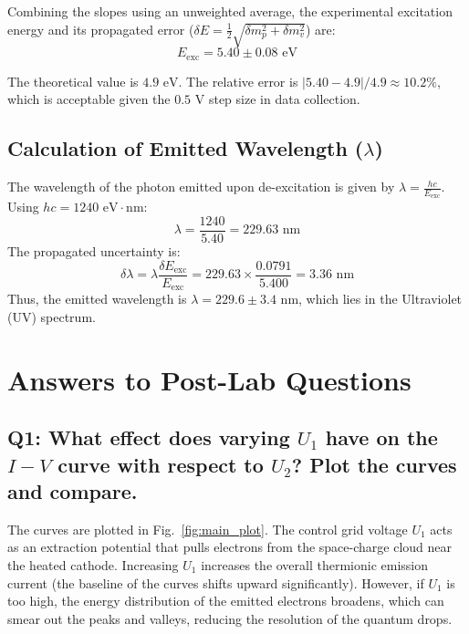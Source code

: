 \documentclass[a4paper,11pt]{article}
\begin{document}
Combining the slopes using an unweighted average, the experimental excitation energy and its propagated error ($\delta E = \frac{1}{2}\sqrt{\delta m_p^2 + \delta m_v^2}$) are:
\begin{equation}
    E_{\text{exc}} = 5.40 \pm 0.08\text{ eV}
\end{equation}

The theoretical value is $4.9\text{ eV}$. The relative error is $|5.40 - 4.9|/4.9 \approx 10.2\%$, which is acceptable given the $0.5\text{ V}$ step size in data collection.

\subsection{Calculation of Emitted Wavelength ($\lambda$)}
The wavelength of the photon emitted upon de-excitation is given by $\lambda = \frac{hc}{E_{\text{exc}}}$. 
Using $hc = 1240\text{ eV}\cdot\text{nm}$:
\begin{equation}
    \lambda = \frac{1240}{5.40} = 229.63\text{ nm}
\end{equation}
The propagated uncertainty is:
\begin{equation}
    \delta \lambda = \lambda \frac{\delta E_{\text{exc}}}{E_{\text{exc}}} = 229.63 \times \frac{0.0791}{5.400} = 3.36\text{ nm}
\end{equation}
Thus, the emitted wavelength is $\lambda = 229.6 \pm 3.4\text{ nm}$, which lies in the Ultraviolet (UV) spectrum.

\section{Answers to Post-Lab Questions}

\subsection*{Q1: What effect does varying $U_1$ have on the $I-V$ curve with respect to $U_2$? Plot the curves and compare.}
The curves are plotted in Fig.~\ref{fig:main_plot}. The control grid voltage $U_1$ acts as an extraction potential that pulls electrons from the space-charge cloud near the heated cathode. Increasing $U_1$ increases the overall thermionic emission current (the baseline of the curves shifts upward significantly). However, if $U_1$ is too high, the energy distribution of the emitted electrons broadens, which can smear out the peaks and valleys, reducing the resolution of the quantum drops.
\end{document}
